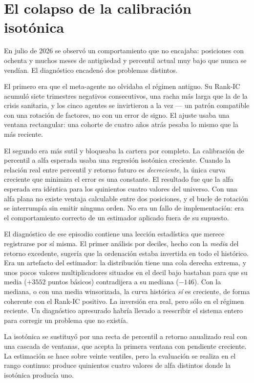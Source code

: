 \section{El colapso de la calibración isotónica}

En julio de 2026 se observó un comportamiento que no encajaba: posiciones con ochenta y muchos meses
de antigüedad y percentil actual muy bajo que nunca se vendían. El diagnóstico encadenó dos
problemas distintos.

El primero era que el meta-agente no olvidaba el régimen antiguo. Su Rank-IC acumuló siete
trimestres negativos consecutivos, una racha más larga que la de la crisis sanitaria, y los cinco
agentes se invirtieron a la vez --- un patrón compatible con una rotación de factores, no con un
error de signo. El ajuste usaba una ventana rectangular: una cohorte de cuatro años atrás pesaba lo
mismo que la más reciente.

El segundo era más sutil y bloqueaba la cartera por completo. La calibración de percentil a alfa
esperada usaba una regresión isotónica creciente. Cuando la relación real entre percentil y retorno
futuro es \emph{decreciente}, la única curva creciente que minimiza el error es una constante. El
resultado fue que la alfa esperada era idéntica para los quinientos cuatro valores del universo. Con
una alfa plana no existe ventaja calculable entre dos posiciones, y el bucle de rotación se
interrumpía sin emitir ninguna orden. No era un fallo de implementación: era el comportamiento
correcto de un estimador aplicado fuera de su supuesto.

El diagnóstico de ese episodio contiene una lección estadística que merece registrarse por sí misma.
El primer análisis por deciles, hecho con la \emph{media} del retorno excedente, sugería que la
ordenación estaba invertida en todo el histórico. Era un artefacto del estimador: la distribución
tiene una cola derecha extrema, y unos pocos valores multiplicadores situados en el decil bajo
bastaban para que su media (${+}3552$ puntos básicos) contradijera a su mediana (${-}146$). Con la
mediana, o con una media winsorizada, la curva histórica \emph{sí} es creciente, de forma coherente
con el Rank-IC positivo. La inversión era real, pero sólo en el régimen reciente. Un diagnóstico
apresurado habría llevado a reescribir el sistema entero para corregir un problema que no existía.

La isotónica se sustituyó por una recta de percentil a retorno anualizado real con una cascada de
ventanas, que acepta la primera ventana con pendiente creciente. La estimación se hace sobre veinte
ventiles, pero la evaluación se realiza en el rango continuo: produce quinientos cuatro valores de
alfa distintos donde la isotónica producía uno.

